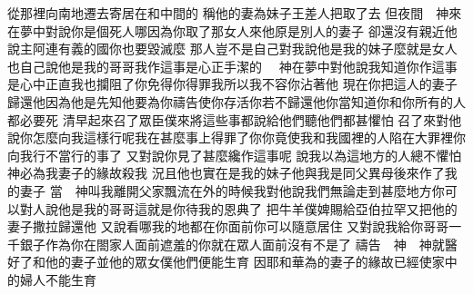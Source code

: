 \bchapter%
從那裡向南地遷去\chientien 寄居在和中間的\chuan 
{}稱他的妻為妹子\chientien{}王差人把取了去\chuan 
{}但夜間　神來在夢中\chientien 對說\chientien 你是個死人哪\chientien 因為你取了那女人來\chientien 他原是別人的妻子\chuan 
{}卻還沒有親近\yuentien 他說\chientien 主阿\chientien 連有義的國你也要毀滅麼\chuan 
{}那人豈不是自己對我說\chientien 他是我的妹子麼\yuentien 就是女人也自己說\chientien 他是我的哥哥\yuentien 我作這事\chientien 是心正手潔的\chuan 
{}　神在夢中對他說\chientien 我知道你作這事是心中正直\chientien 我也攔阻了你\chientien 免得你得罪我\chientien 所以我不容你沾著他\chuan 
{}現在你把這人的妻子歸還他\chientien 因為他是先知\chientien 他要為你禱告\chientien 使你存活\yuentien 你若不歸還他\chientien 你當知道\chientien 你和你所有的人\chientien 都必要死\chuan\Chuan
{}清早起來\chientien 召了眾臣僕來\chientien 將這些事都說給他們聽\chientien 他們都甚懼怕\chuan 
{}召了來\chientien 對他說\chientien 你怎麼向我這樣行呢\chientien 我在甚麼事上得罪了你\chientien 你竟使我和我國裡的人陷在大罪裡\yuentien 你向我行不當行的事了\chuan 
{}又對說\chientien 你見了甚麼纔作這事呢\chuan 
{}說\chientien 我以為這地方的人總不懼怕　神\chientien 必為我妻子的緣故殺我\chuan 
{}況且他也實在是我的妹子\chientien 他與我是同父異母\chientien 後來作了我的妻子\chuan 
{}當　神叫我離開父家飄流在外的時候\chientien 我對他說\chientien 我們無論走到甚麼地方\chientien 你可以對人說\chientien 他是我的哥哥\yuentien 這就是你待我的恩典了\chuan 
{}把牛羊\chientien 僕婢賜給亞伯拉罕\chientien 又把他的妻子撒拉歸還他\chuan 
{}又說\chientien 看哪\chientien 我的地都在你面前\chientien 你可以隨意居住\chuan 
{}又對說\chientien 我給你哥哥一千銀子\chientien 作為你在閤家人面前遮羞的\chientien{}你就在眾人面前沒有不是了\chuan 
{}禱告　神\chientien 　神就醫好了和他的妻子\chientien 並他的眾女僕\chientien 他們便能生育\chuan 
{}因耶和華為的妻子的緣故\chientien 已經使家中的婦人\chientien 不能生育\chuan 
